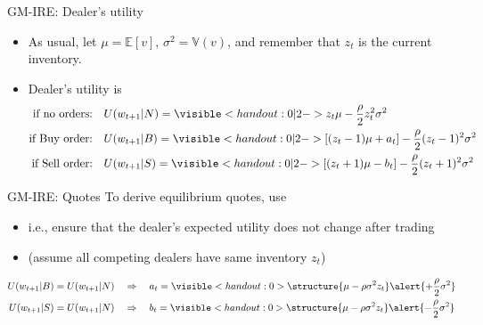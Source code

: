 \documentclass[english,10pt
,aspectratio=169
]{beamer}
\begin{document}
\begin{frame}{GM-IRE: Dealer's utility}
	\begin{itemize}
		\item As usual, let $\mu = \mathbb{E}[v]$, $\sigma^2 = \mathbb{V}(v)$, and remember that $z_t$ is the current inventory.
		\item Dealer's utility is
		\begin{align*}
			\text{if no orders:}\quad & U(w_{t+1}|N) = \visible<handout:0|2->{ z_t \mu - \frac{\rho}{2}z_t^2 \sigma^2 }
			\\
			\text{if Buy order:}\quad & U(w_{t+1}|B) = \visible<handout:0|2->{ \left[(z_t-1)\mu + a_t\right] - \frac{\rho}{2}(z_t-1)^2 \sigma^2 }
			\\
			\text{if Sell order:}\quad & U(w_{t+1}|S) = \visible<handout:0|2->{ \left[(z_t+1)\mu - b_t\right] - \frac{\rho}{2}(z_t+1)^2 \sigma^2 }
		\end{align*}
	\end{itemize}
\end{frame}


\begin{frame}{GM-IRE: Quotes}
	To derive equilibrium \alert{quotes}, use 
	\begin{itemize}
		\item i.e., ensure that the dealer's expected utility does not change after trading
		\item (assume all competing dealers have same inventory $z_t$)
	\end{itemize}
		\begin{align*}
			U(w_{t+1}|B)=U(w_{t+1}|N) \quad & \Rightarrow \quad a_t = \visible<handout:0>{ \structure{\mu - \rho \sigma^2 z_t} \alert{+ \frac{\rho}{2} \sigma^2} }
			\\
			U(w_{t+1}|S)=U(w_{t+1}|N) \quad & \Rightarrow \quad b_t = \visible<handout:0>{ \structure{\mu - \rho \sigma^2 z_t} \alert{- \frac{\rho}{2} \sigma^2} }
		\end{align*}
\end{frame}
\end{document}
